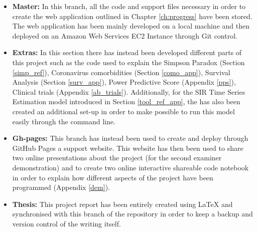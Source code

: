 \begin{appendices}
\begin{itemize}
    \item \textbf{Master:} In this branch, all the code and support files necessary in order to create the web application outlined in Chapter \ref{ch:progress} have been stored. The web application has been mainly developed on a local machine and then deployed on an Amazon Web Services EC2 Instance through Git control.  
    \item \textbf{Extras:} In this section there has instead been developed different parts of this project such as the code used to explain the Simpson Paradox (Section \ref{simp_ref}), Coronavirus comorbidities (Section \ref{como_app}), Survival Analysis (Section \ref{surv_app}), Power Predictive Score (Appendix \ref{pps}),  Clinical trials (Appendix \ref{ab_trials}). Additionally, for the SIR Time Series Estimation model introduced in Section \ref{tool_ref_app}, the has also been created an additional set-up in order to make possible to run this model easily through the command line.
    \item \textbf{Gh-pages:} This branch has instead been used to create and deploy through GitHub Pages a support website. This website has then been used to share two online presentations about the project (for the second examiner demonstration) and to create two online interactive shareable code notebook in order to explain how different aspects of the project have been programmed (Appendix \ref{dem}).  
    \item \textbf{Thesis:} This project report has been entirely created using \LaTeX\:    and synchronised with this branch of the repository in order to keep a backup and version control of the writing itself.
\end{itemize}


\end{appendices}
